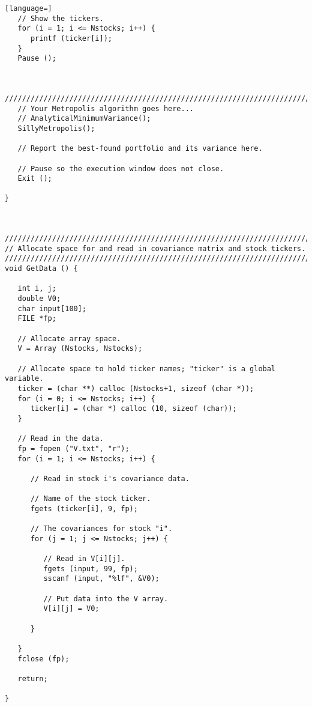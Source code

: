 \documentclass{report}
\begin{document}
\begin{lstlisting}[language=]
   // Show the tickers.
   for (i = 1; i <= Nstocks; i++) {
      printf (ticker[i]);
   }
   Pause ();


   /////////////////////////////////////////////////////////////////////////////
   // Your Metropolis algorithm goes here...
   // AnalyticalMinimumVariance();
   SillyMetropolis();

   // Report the best-found portfolio and its variance here.

   // Pause so the execution window does not close.
   Exit ();

}



////////////////////////////////////////////////////////////////////////////////
// Allocate space for and read in covariance matrix and stock tickers.
////////////////////////////////////////////////////////////////////////////////
void GetData () {

   int i, j;
   double V0;
   char input[100];
   FILE *fp;

   // Allocate array space.
   V = Array (Nstocks, Nstocks);

   // Allocate space to hold ticker names; "ticker" is a global variable.
   ticker = (char **) calloc (Nstocks+1, sizeof (char *));
   for (i = 0; i <= Nstocks; i++) {
      ticker[i] = (char *) calloc (10, sizeof (char));
   }

   // Read in the data.
   fp = fopen ("V.txt", "r");
   for (i = 1; i <= Nstocks; i++) {

      // Read in stock i's covariance data.

      // Name of the stock ticker.
      fgets (ticker[i], 9, fp);

      // The covariances for stock "i".
      for (j = 1; j <= Nstocks; j++) {

         // Read in V[i][j].
         fgets (input, 99, fp);
         sscanf (input, "%lf", &V0);

         // Put data into the V array.
         V[i][j] = V0;

      }

   }
   fclose (fp);

   return;

}
\end{lstlisting}
\pagebreak
\end{document}
